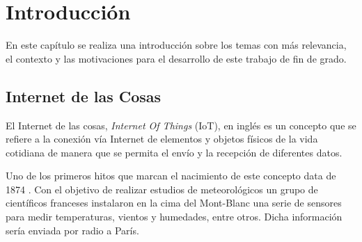 \documentclass[a4paper, 12pt, oneside]{book}
\begin{document}


\tableofcontents 
\cleardoublepage
\listoffigures %



\cleardoublepage
\chapter{Introducción}
\label{chap:intro} %

En este capítulo se realiza una introducción sobre los temas con más relevancia, el contexto y las motivaciones para el desarrollo de este trabajo de fin de grado.

\section{Internet de las Cosas}
\label{sec:Internet de las Cosas}
El Internet de las cosas, \textit{Internet Of Things} (IoT), en inglés es un concepto que se refiere a la conexión vía Internet de elementos y objetos físicos de la vida cotidiana de manera que se permita el envío y la recepción de diferentes datos.

Uno de los primeros hitos que marcan el nacimiento de este concepto data de 1874 \cite{iot_origen}. Con el objetivo de realizar estudios de meteorológicos un grupo de científicos franceses instalaron en la cima del Mont-Blanc una serie de sensores para medir temperaturas, vientos y humedades, entre otros. Dicha información sería enviada por radio a París.
\end{document}
